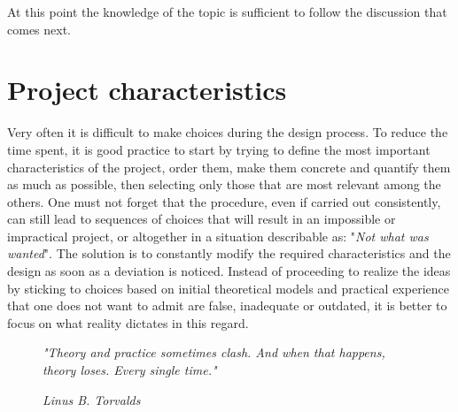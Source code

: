 \documentclass[a4paper, 10pt, final]{article} %
\begin{document}
    At this point the knowledge of the topic is sufficient to follow the discussion that comes next.

    \section{Project characteristics}\label{sec:ProjectCharacteristics}
    Very often it is difficult to make choices during the design process.
    To reduce the time spent, it is good practice to start by trying to define the most important characteristics of the project, order them, make them concrete and quantify them as much as possible, then selecting only those that are most relevant among the others.
    One must not forget that the procedure, even if carried out consistently, can still lead to sequences of choices that will result in an impossible or impractical project, or altogether in a situation describable as: "\emph{Not what was wanted}".
    The solution is to constantly modify the required characteristics and the design as soon as a deviation is noticed.
    Instead of proceeding to realize the ideas by sticking to choices based on initial theoretical models and practical experience that one does not want to admit are false, inadequate or outdated, it is better to focus on what reality dictates in this regard.

    \begin{figure}[H]
        \Centering
        \vspace{1ex}
        \textit{"Theory and practice sometimes clash. And when that happens, theory loses. Every single time."}

        \RaggedLeft
        \vspace{1ex}

        \textit{\scriptsize{Linus B. Torvalds}}
        \vspace{1ex}
    \end{figure}
\end{document}
